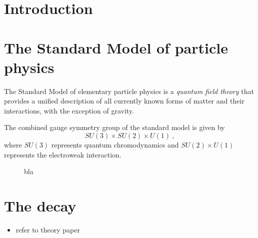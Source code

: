 
\chapter{Introduction}

\chapter{The Standard Model of particle physics}

The Standard Model of elementary particle physics \cite{Citation needed} is a \emph{quantum field theory} that provides a unified description of all currently known forms of matter and their interactions, with the exception of gravity.

The combined gauge symmetry group of the standard model is given by
\begin{equation}
  SU(3)\times SU(2)\times U(1)\:,
\end{equation}
where $SU(3)$ represents quantum chromodynamics and $SU(2)\times U(1)$ represents the electroweak interaction.

\begin{figure}
  \centering
  
  \caption{bla}
\end{figure}

\chapter{The decay \boldmath\decay}

\begin{itemize}
  \item refer to theory paper \cite{Evans}
\end{itemize}

